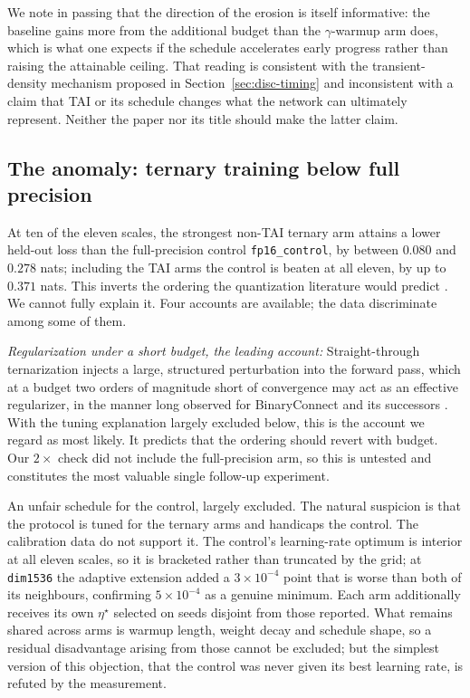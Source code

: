 \documentclass[final,5p,times,twocolumn]{elsarticle}
\theoremstyle{remark}
\begin{document}
We note in passing that the direction of the erosion is itself informative: the
baseline gains more from the additional budget than the $\gamma$-warmup
arm does, which is what one expects if the schedule accelerates early progress
rather than raising the attainable ceiling. That reading is consistent with the
transient-density mechanism proposed in Section~\ref{sec:disc-timing} and
inconsistent with a claim that TAI or its schedule changes what the network can
ultimately represent. Neither the paper nor its title should make the latter
claim.

\subsection{The anomaly: ternary training below full precision}
\label{sec:disc-anomaly}

At ten of the eleven scales, the strongest non-TAI ternary arm attains a lower
held-out loss than the full-precision control \texttt{fp16\_control}, by
between $0.080$ and $0.278$ nats; including the TAI arms the control is beaten
at all eleven, by up to $0.371$ nats. This
inverts the ordering the quantization literature would predict
\cite{nagel2021}. We cannot fully explain it. Four accounts are available; the
data discriminate among some of them.

\textit{Regularization under a short budget, the leading account:} Straight-through
ternarization injects a large, structured perturbation into the forward pass,
which at a budget two orders of magnitude short of convergence may act as an
effective regularizer, in the manner long observed for BinaryConnect and its
successors \cite{courbariaux2015}. With the tuning explanation
largely excluded below, this is the account we regard as most likely. It
predicts that the ordering should revert with budget. Our $2\times$ check did not include the
full-precision arm, so this is untested and constitutes the most valuable
single follow-up experiment.

An unfair schedule for the control, largely excluded. The natural
suspicion is that the protocol is tuned for the ternary arms and handicaps the
control. The calibration data do not support it. The control's learning-rate
optimum is interior at all eleven scales, so it is bracketed rather than
truncated by the grid; at \texttt{dim1536} the adaptive extension added a
$3\times 10^{-4}$ point that is worse than both of its neighbours, confirming
$5\times 10^{-4}$ as a genuine minimum. Each arm additionally receives its own
$\eta^\star$ selected on seeds disjoint from those reported. What remains
shared across arms is warmup length, weight decay and schedule shape, so a
residual disadvantage arising from those cannot be excluded; but the simplest
version of this objection, that the control was never given its best learning
rate, is refuted by the measurement.
\end{document}
